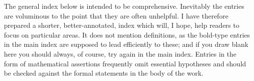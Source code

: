The general index below is intended to be comprehensive.   Inevitably the entries are voluminous to the point that they are often unhelpful.
I have therefore prepared a shorter,
better-annotated, index which will, I hope, help readers to focus on particular areas.   It does not mention definitions, as the
bold-type entries in the main index are supposed to lead efficiently to these;  and if you draw blank here you should always, of course, try again in the main index.
Entries in the form of mathematical assertions frequently omit essential hypotheses and should be checked against the formal statements in the body of the work.
































































































